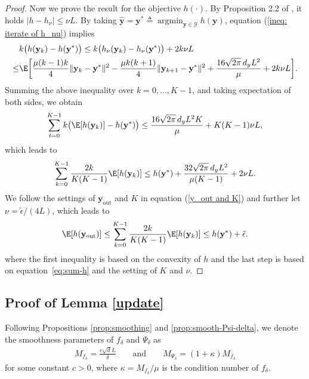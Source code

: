 \documentclass[11pt]{article}
\def\vy{\mathbf{y}}
\def\fY{{\mathcal{Y}}}
\DeclareMathOperator*{\argmin}{argmin}
\begin{document}
\begin{proof}
Now we prove the result for the objective $h(\cdot)$.
By Proposition 2.2 of \citet{lin2022gradient}, it holds \(|h-h_\nu|\le\nu L\). 
{By taking $\hat{\vy}=\vy^*\triangleq\argmin_{\vy\in\fY} h(\vy)$, equation (\ref{ineq: iterate of h_nu}) implies}
\begin{align*}
\begin{split}
&k\big(h(\vy_k) - h( \vy^*)\big)
\le k\big(h_\nu(\vy_k) - h_\nu( \vy^*)\big)+2k\nu L\\
\le& \E\bigg[\frac{\mu(k-1)k}{4}\|\vy_k -  \vy^*\|^2
   - \frac{\mu k (k+1)}{4}\|\vy_{k+1} -  \vy^*\|^2
   + \frac{16\sqrt{2\pi}\, d_yL^2}{\mu}+2k\nu L\bigg].
\end{split}
\end{align*}
Summing the above inequality over $k = 0, \ldots, K-1$, and taking expectation of both sides, we obtain
\[
\sum_{t=0}^{K-1} k\big(\E[h(\vy_k)] - h( \vy^*)\big)
\le \frac{16\sqrt{2\pi}\, d_yL^2K}{\mu}
+K(K-1)\nu L,
\]
which leads to
\begin{align}\label{eq:sum-h}
\begin{split}  
\sum_{k=0}^{K-1} \frac{2k}{K(K-1)} \E[h(\vy_k)]
\le h( \vy^*) + \frac{32\sqrt{2\pi}\, d_yL^2}{\mu(K-1)} +2\nu L.
\end{split}
\end{align}
We follow the settings of $\vy_{\text{out}}$ and $K$ in equation (\ref{y_out and K}) and further let $\nu=\tilde\epsilon/(4L)$, which leads to
\[
\E[h(\vy_{\text{out}})]\le\sum_{k=0}^{K-1} \frac{2k}{K(K-1)} \E[h(\vy_k)]
\le h( \vy^*) + \tilde\epsilon.
\]
where the first inequality is based on the convexity of $h$ and the last step is based on equation~\eqref{eq:sum-h} and the setting of $K$ and $\nu$.
\end{proof}


\subsection{Proof of Lemma \ref{update}}\label{Proof of Proposition of f}

Following Propositions \ref{prop:smoothing} and \ref{prop:smooth-Psi-delta}, we denote the smoothness parameters of $f_\delta$ and $\Psi_\delta$ as
\begin{align}\label{Notation: smoothness}
    M_{f_\delta} =\frac{c \sqrt{d}L}{\delta}
    \qquad \text{and} \qquad 
    M_{\Psi_\delta}=(1+\kappa)M_{f_\delta}
\end{align}
for some constant $c>0$, where  $\kappa={M_{f_\delta}}/{\mu}$ is the condition number of $f_\delta$.
\end{document}
